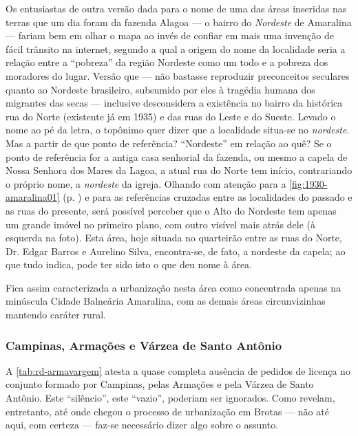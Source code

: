 Os entusiastas de outra versão dada para o nome de uma das áreas inseridas nas terras que um dia foram da fazenda Alagoa --- o bairro do \textit{Nordeste} de Amaralina --- fariam bem em olhar o mapa ao invés de confiar em mais uma invenção de fácil trânsito na internet, segundo a qual a origem do nome da localidade seria a relação entre a ``pobreza'' da região Nordeste como um todo e a pobreza dos moradores do lugar. Versão que --- não bastasse reproduzir preconceitos seculares quanto ao Nordeste brasileiro, subsumido por eles à tragédia humana dos migrantes das secas --- inclusive desconsidera a existência no bairro da histórica rua do Norte (existente já em 1935) e das ruas do Leste e do Sueste. Levado o nome ao pé da letra, o topônimo quer dizer que a localidade situa-se no \textit{nordeste}. Mas a partir de que ponto de referência? ``Nordeste'' em relação ao quê? Se o ponto de referência for a antiga casa senhorial da fazenda, ou mesmo a capela de Nossa Senhora dos Mares da Lagoa, a atual rua do Norte tem início, contrariando o próprio nome, a \textit{nordeste} da igreja. Olhando com atenção para a \autoref{fig:1930-amaralina01} (p. \pageref{fig:1930-amaralina01}) e para as referências cruzadas entre as localidades do passado e as ruas do presente, será possível perceber que o Alto do Nordeste tem apenas um grande imóvel no primeiro plano, com outro visível mais atrás dele (à esquerda na foto). Esta área, hoje situada no quarteirão entre as ruas do Norte, Dr. Edgar Barros e Aurelino Silva, encontra-se, de fato, a nordeste da capela; ao que tudo indica, pode ter sido isto o que deu nome à área.


Fica assim caracterizada a urbanização nesta área como concentrada apenas na minúscula Cidade Balneária Amaralina, com as demais áreas circunvizinhas mantendo caráter rural. 

\subsubsection{Campinas, Armações e Várzea de Santo Antônio}\label{subsubsec:campinas}


A \autoref{tab:rd-armavargem} atesta a quase completa ausência de pedidos de licença no conjunto formado por Campinas, pelas Armações e pela Várzea de Santo Antônio. Este ``silêncio'', este ``vazio'', poderiam ser ignorados. Como revelam, entretanto, até onde chegou o processo de urbanização em Brotas --- não até aqui, com certeza --- faz-se necessário dizer algo sobre o assunto. 

